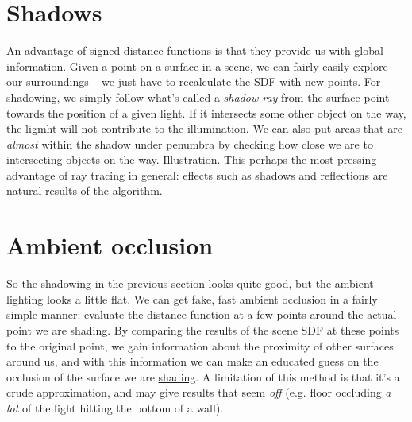 \documentclass[abstract=off,oneside]{scrreprt}
\begin{document}
\section*{Shadows}
\label{sec-6}
\label{sec:shadows} An advantage of signed distance functions is that they
provide us with global information. Given a point on a surface in a
scene, we can fairly easily explore our surroundings -- we just have
to recalculate the SDF with new points. For shadowing, we simply
follow what's called a \emph{shadow ray} from the surface point towards the
position of a given light. If it intersects some other object on the
way, the ligmht will not contribute to the illumination. We can also
put areas that are \emph{almost} within the shadow under penumbra by
checking how close we are to intersecting objects on the
way. \hyperref[fig:penumbra]{Illustration}. This perhaps the most pressing advantage of ray
tracing in general: effects such as shadows and reflections are
natural results of the algorithm.

\section*{Ambient occlusion}
\label{sec-7}
\label{sec:ao}
So the shadowing in the previous section looks quite good, but the
ambient lighting looks a little flat. We can get fake, fast ambient
occlusion in a fairly simple manner: evaluate the distance function at
a few points around the actual point we are shading. By comparing the
results of the scene SDF at these points to the original point, we
gain information about the proximity of other surfaces around us, and
with this information we can make an educated guess on the occlusion
of the surface we are \hyperref[fig:ao]{shading}. A limitation of this method is that
it's a crude approximation, and may give results that seem \emph{off}
(e.g. floor occluding \emph{a lot} of the light hitting the bottom of a
wall).
\end{document}
